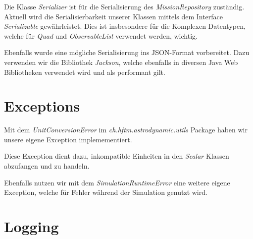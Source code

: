 Die Klasse \textit{Serializer} ist für die Serialisierung des \textit{MissionRepository} zuständig.
Aktuell wird die Serialisierbarkeit unserer Klassen mittels dem Interface \textit{Serializable} gewährleistet.
Dies ist insbesondere für die Komplexen Datentypen, welche für \textit{Quad} und \textit{ObservableList} verwendet werden, wichtig.

Ebenfalls wurde eine mögliche Serialisierung ins JSON-Format vorbereitet. Dazu verwenden wir die Bibliothek \textit{Jackson}, welche ebenfalls in diversen Java Web Bibliotheken verwendet wird und als performant gilt.

\section{Exceptions}

Mit dem \textit{UnitConversionError} im \textit{ch.hftm.astrodynamic.utils} Package haben wir unsere eigene Exception implemementiert.

Diese Exception dient dazu, inkompatible Einheiten in den \textit{Scalar} Klassen abzufangen und zu handeln.

Ebenfalls nutzen wir mit dem \textit{SimulationRuntimeError} eine weitere eigene Exception, welche für Fehler während der Simulation genutzt wird.

\section{Logging}


